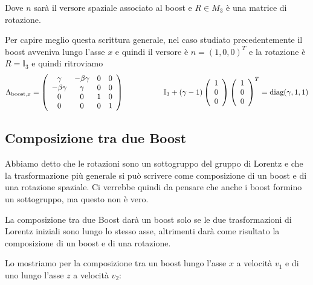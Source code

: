 \documentclass[12pt,a4paper,titlepage, twoside, openright]{book}
\numberwithin{equation}{chapter}
\begin{document}
Dove $n$ sarà il versore spaziale associato al boost e $R\in M_3$ è una matrice di rotazione.

Per capire meglio questa scrittura generale, nel caso studiato precedentemente il boost avveniva lungo l'asse $x$ e quindi il versore è $n=(1,0,0)^T$ e la rotazione è $R=\mathbb{I}_3$ e quindi ritroviamo
\[
\Lambda_{\text{boost,}x} =
\left(\begin{array}{cccc}
\gamma & -\beta\gamma & 0 & 0 \\
-\beta\gamma & \gamma & 0 & 0 \\
0 & 0 & 1 & 0 \\
0 & 0 & 0 & 1 \\
\end{array}\right) \hspace{0.15\linewidth}
\mathbb{I}_3+(\gamma-1)\left(\begin{array}{c}1 \\ 0 \\ 0 \end{array}\right) \left(\begin{array}{c}1 \\ 0 \\ 0 \end{array}\right)^T=\text{diag}(\gamma,1,1)
\]

\subsection{Composizione tra due Boost}\label{sezComposizioneBoost}

Abbiamo detto che le rotazioni sono un sottogruppo del gruppo di Lorentz e che la trasformazione più generale si può scrivere come composizione di un boost e di una rotazione spaziale. Ci verrebbe quindi da pensare che anche i boost formino un sottogruppo, ma questo non è vero. 

La composizione tra due Boost darà un boost solo se le due trasformazioni di Lorentz iniziali sono lungo lo stesso asse, altrimenti darà come risultato la composizione di un boost e di una rotazione.

Lo mostriamo per la composizione tra un boost lungo l'asse $x$ a velocità $v_1$ e di uno lungo l'asse $z$ a velocità $v_2$:
\end{document}
